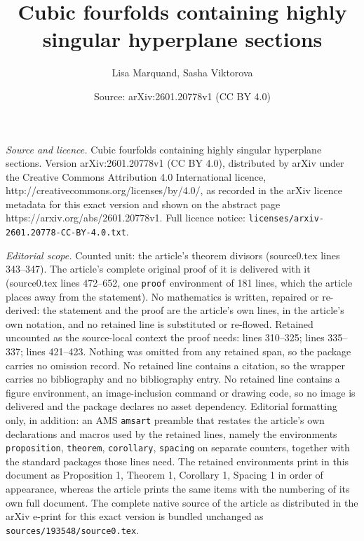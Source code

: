 \documentclass[10pt,a4paper]{amsart}
\title{Cubic fourfolds containing highly singular hyperplane sections}
\author{Lisa Marquand, Sasha Viktorova}
\date{Source: arXiv:2601.20778v1 (CC BY 4.0)}
\begin{document}
\maketitle

\noindent\emph{Source and licence.} Cubic fourfolds containing highly singular hyperplane sections. Version arXiv:2601.20778v1 (CC BY 4.0), distributed by arXiv under the Creative Commons Attribution 4.0 International licence, http://creativecommons.org/licenses/by/4.0/, as recorded in the arXiv licence metadata for this exact version and shown on the abstract page https://arxiv.org/abs/2601.20778v1. Full licence notice: \texttt{licenses/arxiv-2601.20778-CC-BY-4.0.txt}.\par\smallskip

\noindent\textit{Editorial scope.} Counted unit: the article's theorem divisors (source0.tex lines 343--347). The article's complete original proof of it is delivered with it (source0.tex lines 472--652, one \texttt{proof} environment of 181 lines, which the article places away from the statement). No mathematics is written, repaired or re-derived: the statement and the proof are the article's own lines, in the article's own notation, and no retained line is substituted or re-flowed.  Retained uncounted as the source-local context the proof needs: lines 310--325; lines 335--337; lines 421--423.  Nothing was omitted from any retained span, so the package carries no omission record.  No retained line contains a citation, so the wrapper carries no bibliography and no bibliography entry.  No retained line contains a figure environment, an image-inclusion command or drawing code, so no image is delivered and the package declares no asset dependency.  Editorial formatting only, in addition: an AMS \texttt{amsart} preamble that restates the article's own declarations and macros used by the retained lines, namely the environments \texttt{proposition}, \texttt{theorem}, \texttt{corollary}, \texttt{spacing} on separate counters, together with the standard packages those lines need.  The retained environments print in this document as Proposition 1, Theorem 1, Corollary 1, Spacing 1 in order of appearance, whereas the article prints the same items with the numbering of its own full document.  The complete native source of the article as distributed in the arXiv e-print for this exact version is bundled unchanged as \texttt{sources/193548/source0.tex}.
\end{document}
